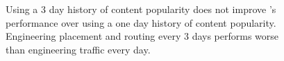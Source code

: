 {\begin{figure}[t]
\begin{center}
\end{center}
\caption{Using a 3 day history of content popularity does not improve \optrp's performance over using a one day history of content popularity. Engineering placement and routing every 3 days performs worse than engineering traffic every day.}
\label{fig:history}
\end{figure}

}

 

